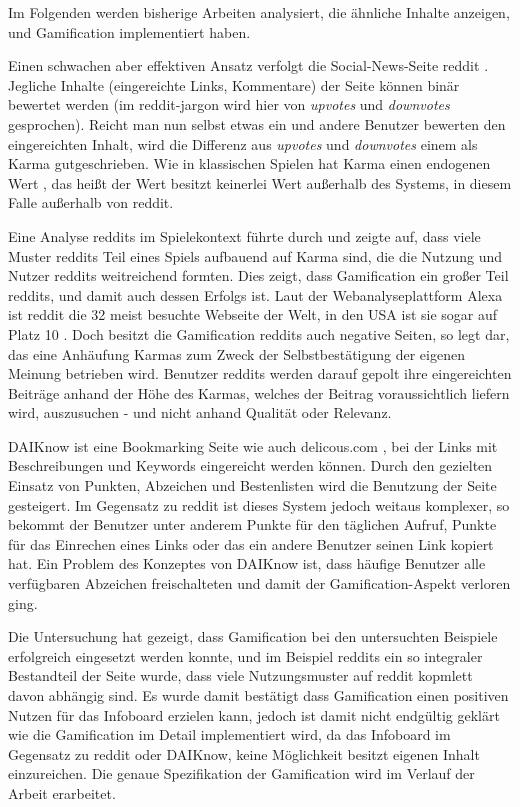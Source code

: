 \documentclass[12pt,twoside]{book}
\begin{document}
Im Folgenden werden bisherige Arbeiten analysiert, die ähnliche Inhalte anzeigen, und Gamification implementiert haben.

Einen schwachen aber effektiven Ansatz verfolgt die Social-News-Seite reddit \cite{reddit}. Jegliche Inhalte (eingereichte Links, Kommentare) der Seite können binär bewertet werden (im reddit-jargon wird hier von \textit{upvotes} und \textit{downvotes} gesprochen). Reicht man nun selbst etwas ein und andere Benutzer bewerten den eingereichten Inhalt, wird die Differenz aus \textit{upvotes} und \textit{downvotes} einem als Karma gutgeschrieben. Wie in klassischen Spielen hat Karma einen endogenen Wert \citep[pp. 21 - 22]{costikyan2005have}, das heißt der Wert besitzt keinerlei Wert außerhalb des Systems, in diesem Falle außerhalb von reddit.

Eine Analyse reddits im Spielekontext führte \cite{massanari2013playful} durch und zeigte auf, dass viele Muster reddits Teil eines Spiels aufbauend auf Karma sind, die die Nutzung und Nutzer reddits weitreichend formten.
Dies zeigt, dass Gamification ein großer Teil reddits, und damit auch dessen Erfolgs ist. Laut der Webanalyseplattform Alexa ist reddit die 32 meist besuchte Webseite der Welt, in den USA ist sie sogar auf Platz 10 \cite{alexa}.
Doch besitzt die Gamification reddits auch negative Seiten, so legt \citep{richerichkarma}  dar, das eine Anhäufung Karmas zum Zweck der Selbstbestätigung der eigenen Meinung betrieben wird. Benutzer reddits werden darauf gepolt ihre eingereichten Beiträge anhand der Höhe des Karmas, welches der Beitrag voraussichtlich liefern wird, auszusuchen - und nicht anhand Qualität oder Relevanz.

DAIKnow \citep{meder2014daiknow} ist eine Bookmarking Seite wie auch delicous.com \cite{delicious}, bei der Links mit Beschreibungen und Keywords eingereicht werden können. Durch den gezielten Einsatz von Punkten, Abzeichen und Bestenlisten wird die Benutzung der Seite gesteigert. Im Gegensatz zu reddit ist dieses System jedoch weitaus komplexer, so bekommt der Benutzer unter anderem Punkte für den täglichen Aufruf, Punkte für das Einrechen eines Links oder das ein andere Benutzer seinen Link kopiert hat.
Ein Problem des Konzeptes von DAIKnow ist, dass häufige Benutzer alle verfügbaren Abzeichen freischalteten und damit der Gamification-Aspekt verloren ging.

Die Untersuchung hat gezeigt, dass Gamification bei den untersuchten Beispiele erfolgreich eingesetzt werden konnte, und im Beispiel reddits ein so integraler Bestandteil der Seite wurde, dass viele Nutzungsmuster auf reddit kopmlett davon abhängig sind. Es wurde damit bestätigt dass Gamification einen positiven Nutzen für das Infoboard erzielen kann, jedoch ist damit nicht endgültig geklärt wie die Gamification im Detail implementiert wird, da das Infoboard im Gegensatz zu reddit oder DAIKnow, keine Möglichkeit besitzt eigenen Inhalt einzureichen. Die genaue Spezifikation der Gamification wird im Verlauf der Arbeit erarbeitet.
\end{document}
